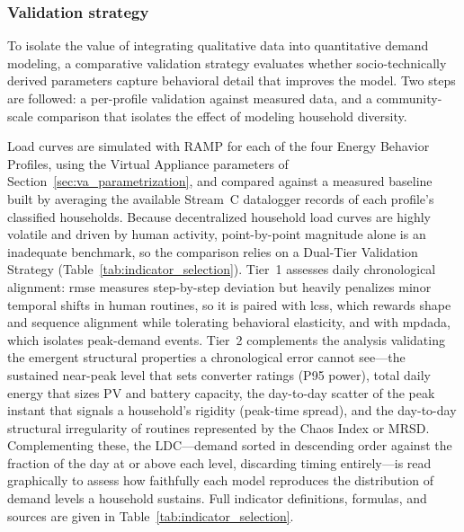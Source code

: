 \documentclass[final,3p,times,onecolumn]{elsarticle}
\begin{document}
\subsubsection{Validation strategy}
\label{sec:methods_sim}

To isolate the value of integrating qualitative data into quantitative demand modeling, a comparative validation strategy evaluates whether socio-technically derived parameters capture behavioral detail that improves the model. Two steps are followed: a per-profile validation against measured data, and a community-scale comparison that isolates the effect of modeling household diversity.

Load curves are simulated with RAMP for each of the four Energy Behavior Profiles, using the Virtual Appliance parameters of Section~\ref{sec:va_parametrization}, and compared against a measured baseline built by averaging the available Stream~C datalogger records of each profile's classified households. Because decentralized household load curves are highly volatile and driven by human activity, point-by-point magnitude alone is an inadequate benchmark, so the comparison relies on a Dual-Tier Validation Strategy (Table~\ref{tab:indicator_selection}). Tier~1 assesses daily chronological alignment: \gls{rmse} measures step-by-step deviation but heavily penalizes minor temporal shifts in human routines, so it is paired with \gls{lcss}, which rewards shape and sequence alignment while tolerating behavioral elasticity, and with \gls{mpdada}, which isolates peak-demand events. Tier~2 complements the analysis validating the emergent structural properties a chronological error cannot see---the sustained near-peak level that sets converter ratings (P95 power), total daily energy that sizes PV and battery capacity, the day-to-day scatter of the peak instant that signals a household's rigidity (peak-time spread), and the day-to-day structural irregularity of routines represented by the Chaos Index or \gls{MRSD}. Complementing these, the \gls{LDC}---demand sorted in descending order against the fraction of the day at or above each level, discarding timing entirely---is read graphically to assess how faithfully each model reproduces the distribution of demand levels a household sustains. Full indicator definitions, formulas, and sources are given in Table~\ref{tab:indicator_selection}.
\end{document}
